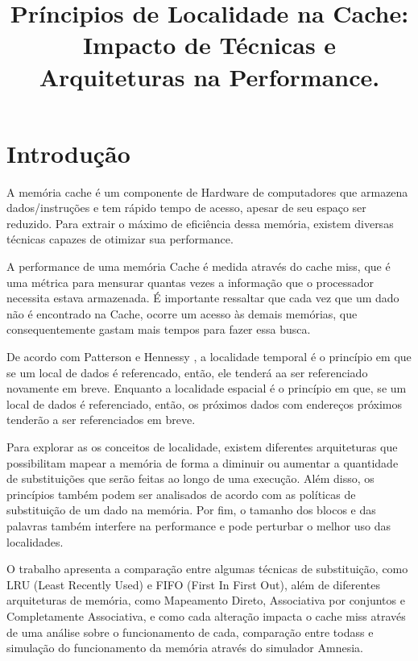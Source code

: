 \documentclass[conference]{IEEEtran}
\begin{document}
\title{Príncipios de Localidade na Cache: Impacto de Técnicas e Arquiteturas na Performance.\\

}

\author{
\and
{}
}

\maketitle

\section{Introdução}
A memória cache é um componente de Hardware de computadores que armazena dados/instruções e tem rápido tempo de acesso, apesar de seu espaço ser reduzido. Para extrair o máximo de eficiência dessa memória, existem diversas técnicas capazes de otimizar sua performance.

A performance de uma memória Cache é medida através do cache miss, que é uma métrica para mensurar quantas vezes a informação que o processador necessita estava armazenada. É importante ressaltar que cada vez que um dado não é encontrado na Cache, ocorre um acesso às demais memórias, que consequentemente gastam mais tempos para fazer essa busca.

De acordo com Patterson e Hennessy \cite{patterson2017}, a localidade temporal é o princípio em que se um local de dados é referencado, então, ele tenderá aa ser referenciado novamente em breve. Enquanto a localidade espacial é o princípio em que, se um local de dados é referenciado, então, os próximos dados com endereços próximos tenderão a ser referenciados em breve.

Para explorar as os conceitos de localidade, existem diferentes arquiteturas que possibilitam mapear a memória de forma a diminuir ou aumentar a quantidade de substituições que serão feitas ao longo de uma execução. Além disso, os princípios também podem ser analisados de acordo com as políticas de substituição de um dado na memória. Por fim, o tamanho dos blocos e das palavras também interfere na performance e pode perturbar o melhor uso das localidades.

O trabalho apresenta a comparação entre algumas técnicas de substituição, como LRU (Least Recently Used) e FIFO (First In First Out), além de diferentes arquiteturas de memória, como Mapeamento Direto, Associativa por conjuntos e Completamente Associativa, e como cada alteração impacta o cache miss através de uma análise sobre o funcionamento de cada, comparação entre todass e simulação do funcionamento da memória através do simulador Amnesia.
\end{document}
